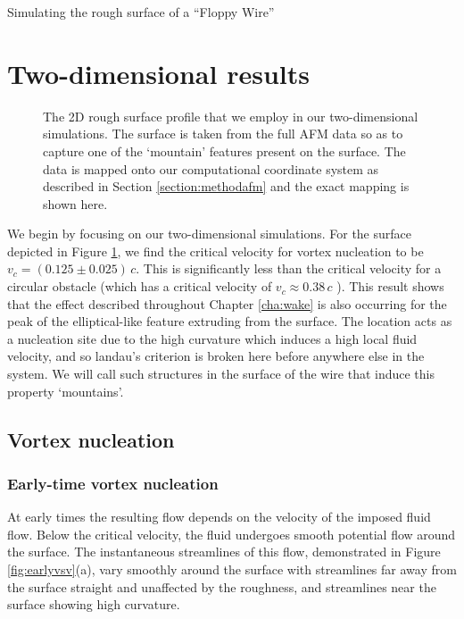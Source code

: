 \begin{chapter}{\label{cha:afm}Simulating the rough surface of a ``Floppy Wire''}
\section{Two-dimensional results}
\begin{figure}
  \centering
  \caption{\label{fig:surfprofile} The 2D rough surface profile that we employ in our two-dimensional simulations. The surface is taken from the full AFM data so as to capture one of the `mountain' features present on the surface. The data is mapped onto our computational coordinate system as described in Section \ref{section:methodafm} and the exact mapping is shown here.}
\end{figure}

We begin by focusing on our two-dimensional simulations. For the surface depicted in Figure \ref{fig:surfprofile}, we find the critical velocity for vortex nucleation to be $v_c=(0.125\pm0.025)\,c$. This is significantly less than the critical velocity for a circular obstacle (which has a critical velocity of $v_c\approx 0.38\,c$ \cite{frisch92,nore93,win00,huepe00}). This result shows that the effect described throughout Chapter \ref{cha:wake} is also occurring for the peak of the elliptical-like feature extruding from the surface. The location acts as a nucleation site due to the high curvature which induces a high local fluid velocity, and so landau's criterion is broken here before anywhere else in the system. We will call such structures in the surface of the wire that induce this property `mountains'.

\subsection{Vortex nucleation}
\subsubsection{Early-time vortex nucleation}
At early times the resulting flow depends on the velocity of the imposed fluid flow. Below the critical velocity, the fluid undergoes smooth potential flow around the surface. The instantaneous streamlines of this flow, demonstrated in Figure \ref{fig:earlyvsv}(a), vary smoothly around the surface with streamlines far away from the surface straight and unaffected by the roughness, and streamlines near the surface showing high curvature.


\end{chapter}
